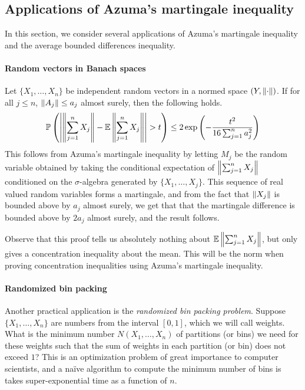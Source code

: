 \documentclass[11pt]{article}
\begin{document}
\subsection{Applications of Azuma's martingale inequality}
\label{sec:appl-azum-mart}

In this section, we consider several applications of Azuma's martingale inequality and the average bounded differences inequality.

\paragraph{Random vectors in Banach spaces}

Let $\{X_1, \ldots, X_n\}$ be independent random vectors in a normed space $(Y, \left\lVert\cdot\right\rVert)$.
If for all $j \leq n$, $\left\lVert A_j\right\rVert \leq a_j$ almost surely, then the following holds.
\begin{align*}
  \mathbb{P}\left( \left| \left\lVert \sum_{j=1}^n X_j\right\rVert - \mathbb{E}  \left\lVert \sum_{j=1}^n X_j\right\rVert  \right| > t \right)
  \leq 2 \exp \left( - \frac{t^2}{16 \sum_{j=1}^n a_j^2} \right)
\end{align*}
This follows from Azuma's martingale inequality by letting $M_j$ be the random variable obtained by taking the conditional expectation of $\left\lVert\sum_{j=1}^n X_j\right\rVert$ conditioned on the $\sigma$-algebra generated by $\{X_1, \ldots, X_j\}$.
This sequence of real valued random variables forms a martingale, and from the fact that $\left\lVert X_j\right\rVert$ is bounded above by $a_j$ almost surely, we get that that the martingale difference is bounded above by $2a_j$ almost surely, and the result follows.

Observe that this proof tells us absolutely nothing about $\mathbb{E} \left\lVert\sum_{j=1}^n X_j\right\rVert$, but only gives a concentration inequality about the mean.
This will be the norm when proving concentration inequalities using Azuma's martingale inequality.

\paragraph{Randomized bin packing}

Another practical application is the \emph{randomized bin packing problem}.
Suppose $\{X_1, \ldots, X_n\}$ are numbers from the interval $[0,1]$, which we will call weights.
What is the minimum number $N(X_1, \ldots, X_n)$ of partitions (or bins) we need for these weights such that the sum of weights in each partition (or bin) does not exceed $1$?
This is an optimization problem of great importance to computer scientists, and a naïve algorithm to compute the minimum number of bins is takes super-exponential time as a function of $n$.
\end{document}
